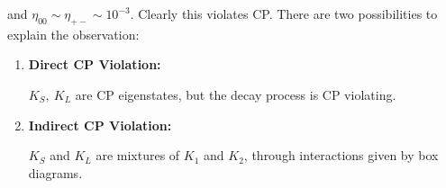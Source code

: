 and $\eta_{00} \sim \eta_{+-} \sim 10^{-3}$. Clearly this violates CP. There are two possibilities to explain the observation:
\begin{enumerate}
\item \textbf{Direct CP Violation: }

$K_S,\ K_L$ are CP eigenstates, but the decay process is CP violating.
\begin{figure}[H]
  \hfill
  \end{figure}
\item \textbf{Indirect CP Violation: }

$K_S$ and $K_L$ are mixtures of $K_1$ and $K_2$, through interactions given by box diagrams. 
\begin{figure}[H] 
  \hfill
  \end{figure}
\end{enumerate}
